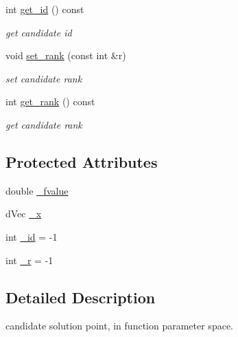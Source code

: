 \begin{DoxyCompactItemize}
int \hyperlink{classlibcmaes_1_1Candidate_a19771115fe14459f23cb445dc5e93fcb}{get\+\_\+id} () const 
\begin{DoxyCompactList}\small\item\em get candidate id \end{DoxyCompactList}\item 
void \hyperlink{classlibcmaes_1_1Candidate_a945db7b42af583473c6debae5b0d0562}{set\+\_\+rank} (const int \&r)
\begin{DoxyCompactList}\small\item\em set candidate rank \end{DoxyCompactList}\item 
int \hyperlink{classlibcmaes_1_1Candidate_ad23e0d3f374b16cccff1d74b8136e9b6}{get\+\_\+rank} () const 
\begin{DoxyCompactList}\small\item\em get candidate rank \end{DoxyCompactList}\end{DoxyCompactItemize}
\subsection*{Protected Attributes}
\begin{DoxyCompactItemize}
\item 
double \hyperlink{classlibcmaes_1_1Candidate_af8797627514ae7e137317337372fb67d}{\+\_\+fvalue}
\item 
d\+Vec \hyperlink{classlibcmaes_1_1Candidate_a0cded1d38ec7288e8064414c78023fe4}{\+\_\+x}
\item 
int \hyperlink{classlibcmaes_1_1Candidate_a9737d4522cdf968ea575d8e989bfe4ac}{\+\_\+id} = -\/1
\item 
int \hyperlink{classlibcmaes_1_1Candidate_a776ee8e4864d5e5322f1593dc4242619}{\+\_\+r} = -\/1
\end{DoxyCompactItemize}


\subsection{Detailed Description}
candidate solution point, in function parameter space. 

